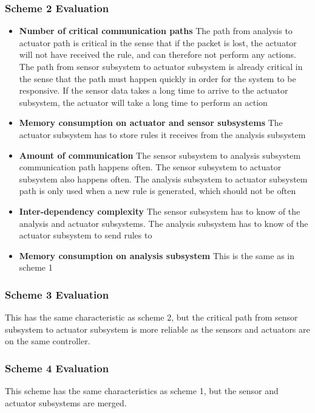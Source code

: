 \subsubsection{Scheme 2 Evaluation}
\begin{itemize}
\item \textbf{Number of critical communication paths} The path from analysis to actuator path is critical in the sense that if the packet is lost, the actuator will not have received the rule, and can therefore not perform any actions. The path from sensor subsystem to actuator subsystem is already critical in the sense that the path must happen quickly in order for the system to be responsive. If the sensor data takes a long time to arrive to the actuator subsystem, the actuator will take a long time to perform an action
\item \textbf{Memory consumption on actuator and sensor subsystems} The actuator subsystem has to store rules it receives from the analysis subsystem
\item \textbf{Amount of communication} The sensor subsystem to analysis subsystem communication path happens often. The sensor subsystem to actuator subsystem also happens often. The analysis subsystem to actuator subsystem path is only used when a new rule is generated, which should not be often
\item \textbf{Inter-dependency complexity} The sensor subsystem has to know of the analysis and actuator subsystems. The analysis subsystem has to know of the actuator subsystem to send rules to
\item \textbf{Memory consumption on analysis subsystem} This is the same as in scheme 1
\end{itemize}

\subsubsection{Scheme 3 Evaluation}
This has the same characteristic as scheme 2, but the critical path from sensor subsystem to actuator subsystem is more reliable as the sensors and actuators are on the same controller.

\subsubsection{Scheme 4 Evaluation}
This scheme has the same characteristics as scheme 1, but the sensor and actuator subsystems are merged.

